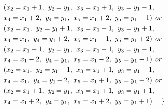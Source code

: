 \begin{appendices}
\begin{itemize}
\begin{align*}
&(x_{2} = x_{1}+1 ,\hspace{1ex}y_{2} = y_{1},\hspace{1ex}x_{3} = x_{1}+1,\hspace{1ex}y_{3} = y_{1}-1,
\\&x_{4} = x_{1}+2,\hspace{1ex}y_{4} = y_{1},\hspace{1ex}x_{5} = x_{1}+2,\hspace{1ex}y_{5} = y_{1}-1)\hspace{1ex} or \\
&(x_{2} = x_{1},\hspace{1ex}y_{2} = y_{1}+1,\hspace{1ex}x_{3} = x_{1}-1,\hspace{1ex}y_{3} = y_{1}+1,
\\&x_{4} = x_{1},\hspace{1ex}y_{4} = y_{1}+2,\hspace{1ex}x_{5} = x_{1}-1,\hspace{1ex}y_{5} = y_{1}+2)\hspace{1ex} or \\
&(x_{2} = x_{1}-1 ,\hspace{1ex}y_{2} = y_{1},\hspace{1ex}x_{3} = x_{1}-1,\hspace{1ex}y_{3} = y_{1}-1,
\\&x_{4} = x_{1}-2,\hspace{1ex}y_{4} = y_{1},\hspace{1ex}x_{5} = x_{1}-2,\hspace{1ex}y_{5} = y_{1}-1)\hspace{1ex} or \\
&(x_{2} = x_{1} ,\hspace{1ex}y_{2} = y_{1}-1,\hspace{1ex}x_{3} = x_{1}+1,\hspace{1ex}y_{3} = y_{1}-1,
\\&x_{4} = x_{1},\hspace{1ex}y_{4} = y_{1}-2,\hspace{1ex}x_{5} = x_{1}+1,\hspace{1ex}y_{5} = y_{1}-2)\hspace{1ex} or \\
&(x_{2} = x_{1}+1 ,\hspace{1ex}y_{2} = y_{1},\hspace{1ex}x_{3} = x_{1}+1,\hspace{1ex}y_{3} = y_{1}+1,
\\&x_{4} = x_{1}+2,\hspace{1ex}y_{4} = y_{1},\hspace{1ex}x_{5} = x_{1}+2,\hspace{1ex}y_{5} = y_{1}+1)\hspace{3ex}\}

\end{align*}
\end{itemize}
\end{appendices}
